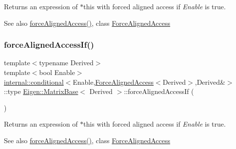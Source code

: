 \begin{DoxyReturn}{Returns}
an expression of $\ast$this with forced aligned access if {\itshape Enable} is true. 
\end{DoxyReturn}
\begin{DoxySeeAlso}{See also}
\mbox{\hyperlink{class_eigen_1_1_matrix_base_afdaf810ac1708ca6d6ecdcfac1e06699}{force\+Aligned\+Access()}}, class \mbox{\hyperlink{class_eigen_1_1_force_aligned_access}{Force\+Aligned\+Access}} 
\end{DoxySeeAlso}
\mbox{\label{class_eigen_1_1_matrix_base_ae35213d1dd4dd13ebe9a7a762d6bb847}} 
\subsubsection{\texorpdfstring{forceAlignedAccessIf()}{forceAlignedAccessIf()}\hspace{0.1cm}{\footnotesize\ttfamily [2/2]}}
{\footnotesize\ttfamily template$<$typename Derived$>$ \\
template$<$bool Enable$>$ \\
\mbox{\hyperlink{struct_eigen_1_1internal_1_1conditional}{internal\+::conditional}}$<$Enable,\mbox{\hyperlink{class_eigen_1_1_force_aligned_access}{Force\+Aligned\+Access}}$<$Derived$>$,Derived\&$>$\+::type \mbox{\hyperlink{class_eigen_1_1_matrix_base}{Eigen\+::\+Matrix\+Base}}$<$ Derived $>$\+::force\+Aligned\+Access\+If (\begin{DoxyParamCaption}{ }\end{DoxyParamCaption})\hspace{0.3cm}{\ttfamily [inline]}}

\begin{DoxyReturn}{Returns}
an expression of $\ast$this with forced aligned access if {\itshape Enable} is true. 
\end{DoxyReturn}
\begin{DoxySeeAlso}{See also}
\mbox{\hyperlink{class_eigen_1_1_matrix_base_afdaf810ac1708ca6d6ecdcfac1e06699}{force\+Aligned\+Access()}}, class \mbox{\hyperlink{class_eigen_1_1_force_aligned_access}{Force\+Aligned\+Access}} 
\end{DoxySeeAlso}
\mbox{\label{class_eigen_1_1_matrix_base_a863bc0e06b641a089508eabec6835ab2}} 
